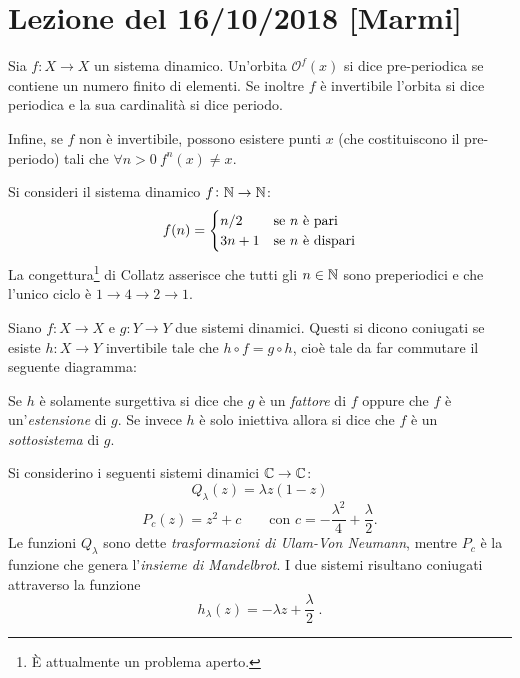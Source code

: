 \section{Lezione del 16/10/2018 [Marmi]}
\begin{definition} Sia $f\colon X \to X$ un sistema dinamico. Un'orbita $\mathcal{O}^f(x)$ si dice pre-periodica se contiene un numero finito di elementi. Se inoltre $ f $ è invertibile l'orbita si dice periodica e la sua cardinalità si dice periodo.
    
Infine, se $f$ non è invertibile, possono esistere punti $ x $ (che costituiscono il pre-periodo) tali che $ \forall n > 0\ f^n (x) \neq x $.
\end{definition}

\begin{example}
Si consideri il sistema dinamico $f \colon \mathbb{N} \to \mathbb{N}$:
\[
    f(n) = 
    \begin{cases}
    	n/2 & \text{se $ n $ è pari}\\
    	3n+1 		& \text{se $ n $ è dispari} \\	
    \end{cases}
\]
La congettura\footnote{È attualmente un problema aperto.} di Collatz asserisce che tutti gli $n \in \mathbb{N}$ sono preperiodici e che l'unico ciclo è $ 1 \to 4 \to 2 \to 1 $.
\end{example}

\begin{definition}
Siano $f\colon X \to X$ e $g\colon Y \to Y$ due sistemi dinamici. Questi si dicono coniugati se esiste $h \colon X \to Y$ invertibile tale che $h \circ f = g \circ h$, cioè tale da far commutare il seguente diagramma:
\begin{center}
\end{center}
Se $h$ è solamente surgettiva si dice che $g$ è un \emph{fattore} di $f$ oppure che $f$ è un'\emph{estensione} di $g$. Se invece $h$ è solo iniettiva allora si dice che $f$ è un \emph{sottosistema} di $g$.
\end{definition}

\begin{example}
Si considerino i seguenti sistemi dinamici $ \mathbb{C} \to \mathbb{C}$:
\[ Q_\lambda(z) = \lambda z (1-z) \] 
\[ P_c(z) = z^2 + c \qquad \text{con } c = - \frac{\lambda^2}{4} +  \frac{\lambda}{2}. \]
Le funzioni $ Q_\lambda $ sono dette \emph{trasformazioni di Ulam-Von Neumann}, mentre $P_c$ è la funzione che genera l'\emph{insieme di Mandelbrot}.
I due sistemi risultano coniugati attraverso la funzione
\[ h_\lambda(z) = -\lambda z + \frac{\lambda}{2}\;. \]
\end{example}

